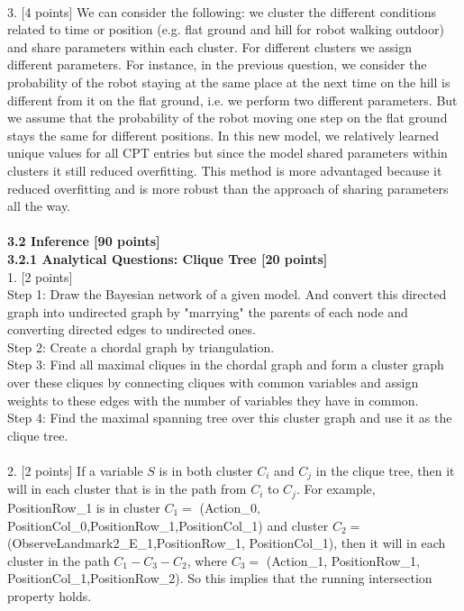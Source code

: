 \documentclass[letterpaper, 11pt]{article}
\begin{document}
\\
3. [4 points]
We can consider the following: we cluster the different conditions related to time or position (e.g. flat ground and hill for robot walking outdoor) and share parameters within each cluster. For different clusters we assign different parameters. For instance, in the previous question, we consider the probability of the robot staying at the same place at the next time on the hill is different from it on the flat ground, i.e. we perform two different parameters. But we assume that the probability of the robot moving one step on the flat ground stays the same for different positions. In this new model, we relatively learned unique values for all CPT entries but since the model shared parameters within clusters it still reduced overfitting. This method is more advantaged because it reduced overfitting and is more robust than the approach of sharing parameters all the way.\\
\\
\noindent \Large \textbf{3.2 Inference [90 points]}\\
\large \textbf{3.2.1 Analytical Questions: Clique Tree [20 points]}\\
1. [2 points]\\
Step 1: 
Draw the Bayesian network of a given model. And convert this directed graph into undirected graph by "marrying" the parents of each node and converting directed edges to undirected ones.\\
Step 2: 
Create a chordal graph by triangulation.\\
Step 3:
Find all maximal cliques in the chordal graph and form a cluster graph over these cliques by connecting cliques with common variables and assign weights  to these edges with the number of variables they have in common.\\
Step 4:
Find the maximal spanning tree over this cluster graph and use it as the clique tree.\\
\\
2. [2 points]
If a variable $S$ is in both cluster $C_i$ and $C_j$ in the clique tree, then it will in each cluster that is in the path from $C_i$ to $C_j$. For example, 
PositionRow\_1 is in cluster $C_1=$ (Action\_0, PositionCol\_0,PositionRow\_1,PositionCol\_1) and cluster $C_2=$ (ObserveLandmark2\_E\_1,PositionRow\_1, PositionCol\_1), then it will in each cluster in the path $C_1-C_3-C_2$, where $C_3=$ (Action\_1, PositionRow\_1, PositionCol\_1,PositionRow\_2). So this implies that the running intersection property holds.\\
\end{document}
